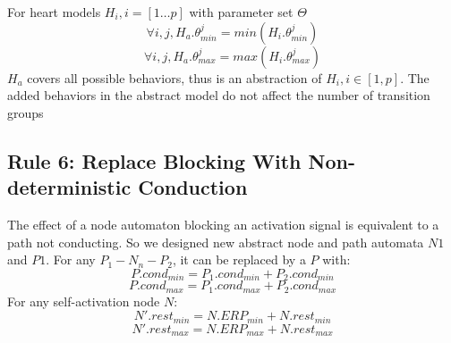 For heart models $H_i,i=[1\dots p]$ with parameter set $\Theta$
$$\forall i,j,H_a.\theta^j_{min}=min(H_i.\theta^j_{min})$$ 
$$\forall i,j,H_a.\theta^j_{max}=max(H_i.\theta^j_{max})$$ 
$H_a$ covers all possible behaviors, thus is an abstraction of $H_i, i\in [1,p]$. The added behaviors in the abstract model do not affect the number of transition groups
%
%
%


\subsection{Rule 6: Replace Blocking With Non-deterministic Conduction}
The effect of a node automaton blocking an activation signal is equivalent to a path not conducting. So we designed new abstract node and path automata $N1$ and $P1$. For any $P_1-N_n-P_2$, it can be replaced by a $P$ with:
$$P.cond_{min}=P_1.cond_{min}+P_2.cond_{min}$$
$$P.cond_{max}=P_1.cond_{max}+P_2.cond_{max}$$
For any self-activation node $N$:
$$N'.rest_{min}=N.ERP_{min}+N.rest_{min}$$
$$N'.rest_{max}=N.ERP_{max}+N.rest_{max}$$

